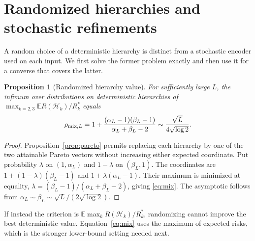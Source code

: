 \documentclass[11pt]{article}
\newtheorem{proposition}[theorem]{Proposition}
\theoremstyle{remark}\newtheorem{remark}[theorem]{Remark}
\newcommand{\E}{\mathbb E}
\newcommand{\cH}{\mathcal H}
\begin{document}
\section{Randomized hierarchies and stochastic refinements}
\label{sec:stochastic}
A random choice of a deterministic hierarchy is distinct from a stochastic
encoder used on each input. We first solve the former problem exactly and
then use it for a converse that covers the latter.

\begin{proposition}[Randomized hierarchy value]
\label{prop:randomized}
For sufficiently large $L$, the infimum over distributions on deterministic
hierarchies of
$\max_{k=2,3}\E R(\cH_k)/R_k^*$ equals
\begin{equation}
 \rho_{{\rm mix},L}
 =1+\frac{(\alpha_L-1)(\beta_L-1)}{\alpha_L+\beta_L-2}
 \sim\frac{\sqrt L}{4\sqrt{\log2}}.
 \label{eq:mix}
\end{equation}
\end{proposition}
\begin{proof}
Proposition~\ref{prop:pareto} permits replacing each hierarchy by one of
the two attainable Pareto vectors without increasing either expected
coordinate. Put probability $\lambda$ on $(1,\alpha_L)$ and
$1-\lambda$ on $(\beta_L,1)$. The coordinates are
$1+(1-\lambda)(\beta_L-1)$ and $1+\lambda(\alpha_L-1)$.
Their maximum is minimized at equality,
$\lambda=(\beta_L-1)/(\alpha_L+\beta_L-2)$, giving
\eqref{eq:mix}. The asymptotic follows from
$\alpha_L\sim\beta_L\sim\sqrt L/(2\sqrt{\log2})$.
\end{proof}

If instead the criterion is $\E\max_k R(\cH_k)/R_k^*$, randomizing
cannot improve the best deterministic value. Equation~\eqref{eq:mix}
uses the maximum of expected risks, which is the stronger lower-bound
setting needed next.
\end{document}
